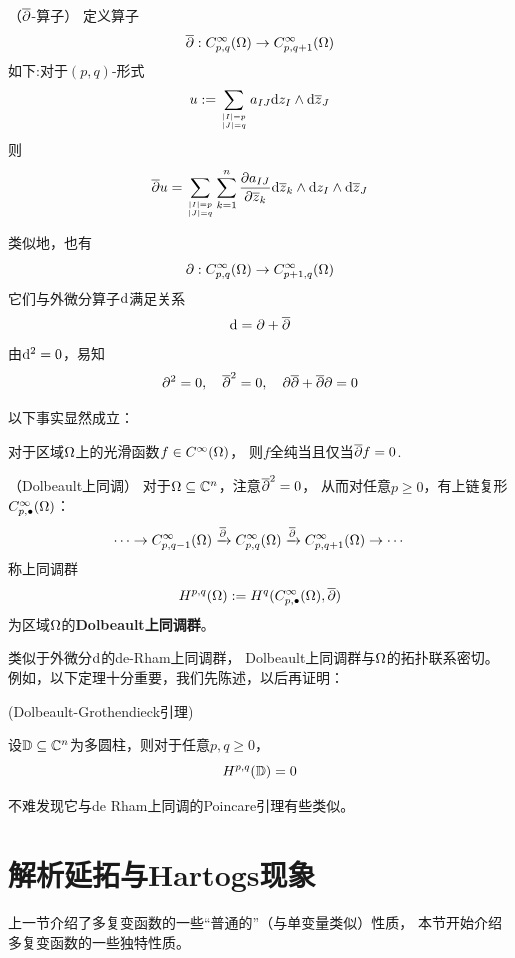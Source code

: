 \begin{notation}（$\overline{\partial}$-算子）
定义算子
$$\overline{\partial}: C^\infty_{p,q}(\Omega)\to C^\infty_{p,q+1}(\Omega)$$
如下:对于$(p,q)$-形式
$$u:=\sum_{|I|=p\atop|J|=q}
a_{IJ}\mathrm{d} z_I\wedge\mathrm{d}\overline{z}_J$$
则
$$
  \overline{\partial} u=
  \sum_{|I|=p\atop|J|=q}
    \sum_{k=1}^n
      \frac{\partial a_{IJ}} {\partial \overline{z}_k}
      \mathrm{d} \overline{z}_k\wedge\mathrm{d} z_I\wedge\mathrm{d}\overline{z}_J
$$
\end{notation}
类似地，也有
$$\partial:C_{p,q}^\infty(\Omega)\to C_{p+1,q}^\infty(\Omega)$$
它们与外微分算子$\mathrm{d}$满足关系
$$\mathrm{d}=\partial+\overline{\partial}$$
由$\mathrm{d}^2=0$，易知
$$\partial^2=0,\quad \overline{\partial}^2=0,\quad \partial\overline{\partial}+\overline{\partial}\partial=0$$

以下事实显然成立：
\begin{lemma}
对于区域$\Omega$上的光滑函数$f\in C^\infty(\Omega)$，
则$f$全纯当且仅当$\overline{\partial} f=0$.
\end{lemma}

\begin{rem}（Dolbeault上同调）
对于$\Omega\subseteq\mathbb{C}^n$，注意$\overline{\partial}^2=0$，
从而对任意$p\geq 0$，有上链复形$C^\infty_{p,\bullet}(\Omega)$：
$$
  \cdots\to
  C^\infty_{p,q-1}(\Omega)
  \xrightarrow{\overline{\partial}}C^\infty_{p,q}(\Omega)
  \xrightarrow{\overline{\partial}}C^\infty_{p,q+1}(\Omega)
  \to\cdots
$$
称上同调群
$$H^{p,q}(\Omega):=H^q(C^\infty_{p,\bullet}(\Omega),\overline{\partial})$$
为区域$\Omega$的\textbf{Dolbeault上同调群}。
\end{rem}
类似于外微分$\mathrm{d}$的de-Rham上同调群，
Dolbeault上同调群与$\Omega$的拓扑联系密切。
例如，以下定理十分重要，我们先陈述，以后再证明：

\begin{lemma}(Dolbeault-Grothendieck引理)

设$\mathbb{D}\subseteq\mathbb{C}^n$为多圆柱，则对于任意$p,q\geq 0$，
$$H^{p,q}(\mathbb{D})=0$$
\end{lemma}

不难发现它与de Rham上同调的Poincare引理有些类似。

\section{解析延拓与Hartogs现象}
上一节介绍了多复变函数的一些“普通的”（与单变量类似）性质，
本节开始介绍多复变函数的一些独特性质。

